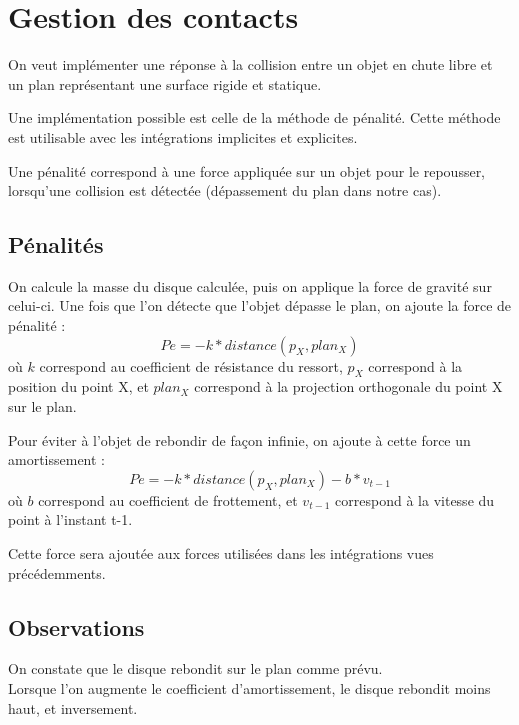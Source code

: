 \documentclass[a4paper]{article}
\begin{document}
\section{Gestion des contacts}

On veut implémenter une réponse à la collision entre un objet en chute libre et un plan représentant une surface rigide et statique.

Une implémentation possible est celle de la méthode de pénalité. Cette méthode est utilisable avec les intégrations implicites et explicites.

Une pénalité correspond à une force appliquée sur un objet pour le repousser, lorsqu'une collision est détectée (dépassement du plan dans notre cas).

\subsection{Pénalités}

On calcule la masse du disque calculée, puis on applique la force de gravité sur celui-ci.
Une fois que l'on détecte que l'objet dépasse le plan, on ajoute la force de pénalité :
\begin{equation}
  Pe = -k * distance(p_X, plan_X)
\end{equation}
où $k$ correspond au coefficient de résistance du ressort, $p_X$ correspond à la position du point X, et $plan_X$ correspond à la projection orthogonale du point X sur le plan.

Pour éviter à l'objet de rebondir de façon infinie, on ajoute à cette force un amortissement :
\begin{equation}
  Pe = -k * distance(p_X, plan_X) - b * v_{t-1}
\end{equation}
où $b$ correspond au coefficient de frottement, et $v_{t-1}$ correspond à la vitesse du point à l'instant t-1.

Cette force sera ajoutée aux forces utilisées dans les intégrations vues précédemments.

\subsection{Observations}

On constate que le disque rebondit sur le plan comme prévu.\\
Lorsque l'on augmente le coefficient d'amortissement, le disque rebondit moins haut, et inversement.
\end{document}
